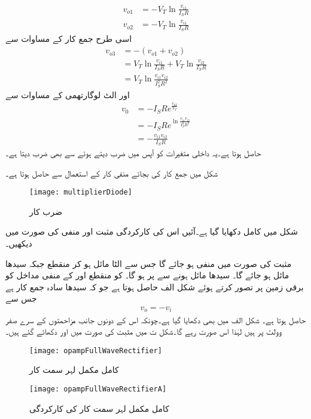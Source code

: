 \begin{align*}
v_{o1}&=-V_T \ln \frac{v_{i1}}{I_S R}\\
v_{o2}&=-V_T \ln \frac{v_{i1}}{I_S R}
\end{align*}
اسی طرح جمع کار کے مساوات سے 
\begin{align*}
v_{o3}&=-\left(v_{o1}+v_{o2} \right)\\
&=V_T \ln \frac{v_{i1}}{I_S R}+V_T \ln \frac{v_{i2}}{I_S R}\\
&=V_T \ln \frac{v_{i1} v_{i2}}{I_S^2 R^2}
\end{align*}
اور الٹ لوگارتھمی کے مساوات سے
\begin{align*}
v_0&=-I_S R e^{\frac{v_{o3}}{V_T}}\\
&=-I_S R e^{\ln \frac{v_{i1} v_{i2}}{I_S^2 R^2}}\\
&=-\frac{v_{i1} v_{i2}}{I_S R}
\end{align*}
حاصل ہوتا ہے۔یہ  داخلی متغیرات کو آپس میں ضرب دیتے ہوئے  سے بھی ضرب دیتا ہے۔

شکل میں جمع کار کی بجائے منفی کار کے استعمال سے  حاصل ہوتا ہے۔
%
\begin{figure}
\centering
\texttt{[image: multiplierDiode]}
\caption{ضرب کار}
\label{شکل_ڈایوڈ_ضرب_کار}
\end{figure}




شکل  میں کامل  دکھایا گیا ہے۔آئیں اس کی کارکردگی مثبت اور منفی  کی صورت میں دیکھیں۔

مثبت  کی صورت میں  منفی ہو جائے گا جس سے  الٹا مائل ہو کر منقطع جبکہ  سیدھا مائل ہو جائے گا۔ سیدھا مائل ہونے سے   پر   ہو گا۔ کو منقطع اور  کے منفی مداخل کو برقی زمین پر تصور کرتے ہوئے  شکل  الف حاصل ہوتا ہے جو کہ سیدھا سادہ جمع کار ہے جس سے
\begin{align*}
v_o=-v_i
\end{align*}
حاصل ہوتا ہے۔ شکل  الف میں  بھی دکھایا گیا ہے۔چونکہ اس کے دونوں جانب مزاحمتوں کے سرے صفر وولٹ پر ہیں لہٰذا اس صورت  رہے گا۔شکل  ت میں مثبت  کی صورت میں  اور  دکھائے گئے ہیں۔
\begin{figure}
\centering
\texttt{[image: opampFullWaveRectifier]}
\caption{کامل مکمل لہر سمت کار}
\label{شکل_کامل_مکمل_لہر_سمت_کار}
\end{figure}
%
\begin{figure}
\centering
\texttt{[image: opampFullWaveRectifierA]}
\caption{کامل مکمل لہر سمت کار کی کارکردگی}
\label{شکل_کامل_مکمل_لہر_سمت_کار_الف}
\end{figure}

